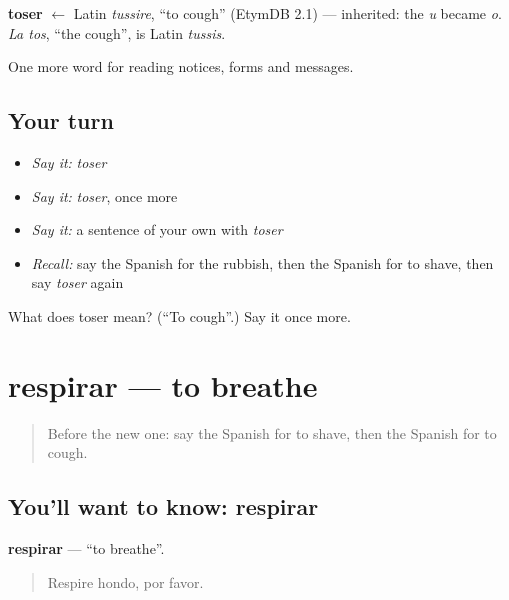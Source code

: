 \begin{cousinweb}
\textbf{toser} $\leftarrow$ Latin \emph{tussire}, \textquotedblleft{}to cough\textquotedblright{} (EtymDB 2.1) — inherited: the \emph{u} became \emph{o}. \emph{La tos}, \textquotedblleft{}the cough\textquotedblright{}, is Latin \emph{tussis}.
\end{cousinweb}

\begin{grammarlens}[title={What you've built}]
One more word for reading notices, forms and messages.
\end{grammarlens}

\subsection*{Your turn}
\begin{itemize}
\raggedright
  \item \emph{Say it:} \emph{toser}
  \item \emph{Say it:} \emph{toser}, once more
  \item \emph{Say it:} a sentence of your own with \emph{toser}
  \item \emph{Recall:} say the Spanish for the rubbish, then the Spanish for to shave, then say \emph{toser} again
\end{itemize}

\begin{tcolorbox}[breakable,colback=teal!4,colframe=teal!35!black,title={Before you move on}]
What does toser mean? (\textquotedblleft{}To cough\textquotedblright{}.) Say it once more.
\end{tcolorbox}
\section[respirar]{respirar — to breathe}

\label{lesson:ES-C486-respirar}



\begin{quote}
Before the new one: say the Spanish for to shave, then the Spanish for to cough.
\end{quote}

\subsection*{You'll want to know: respirar}
\textbf{respirar} — \textquotedblleft{}to breathe\textquotedblright{}.

\begin{quote}
Respire hondo, por favor.
\end{quote}

